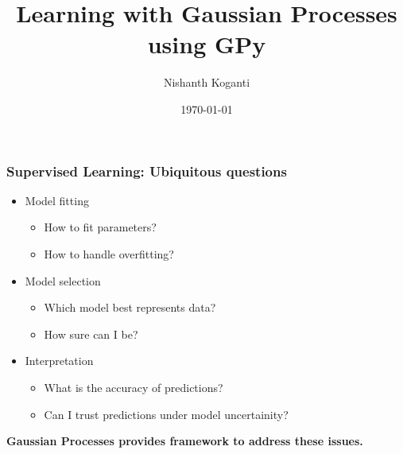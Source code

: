 \documentclass[10pt]{beamer}
\title[GPs with GPy]{Learning with Gaussian Processes using GPy}
\author[Nishanth]{Nishanth Koganti}
\date{\today}
\begin{document}
  \begin{frame}[noframenumbering]
    \titlepage
  \end{frame}

  \begin{frame}
    \frametitle{Supervised Learning: Ubiquitous questions}

    \begin{itemize}
      \item Model fitting
      \begin{itemize}
        \item How to fit parameters?
        \item How to handle overfitting?
      \end{itemize}

      \item Model selection
      \begin{itemize}
        \item Which model best represents data?
        \item How sure can I be?
      \end{itemize}

      \item Interpretation
      \begin{itemize}
        \item What is the accuracy of predictions?
        \item Can I trust predictions under model uncertainity?
      \end{itemize}
    \end{itemize}

    \begin{center}
      \textbf{Gaussian Processes provides framework to address these issues.}
    \end{center}
  \end{frame}
\end{document}
